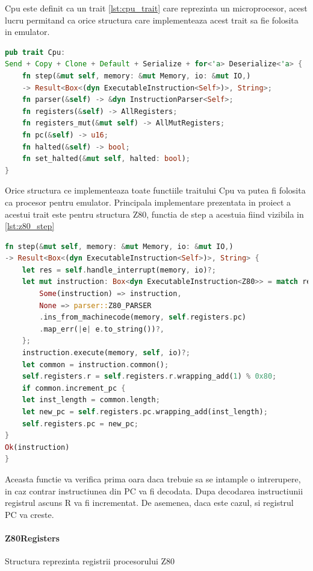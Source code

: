 \documentclass[titlepage,12pt]{article}
\DeclareRobustCommand{\code}[1]{{\ttfamily\small #1}}
\begin{document}
\code{Cpu} este definit ca un trait \cref{lst:cpu_trait} care reprezinta un microprocesor, acest lucru permitand ca orice structura care implementeaza acest trait sa fie folosita in emulator.
\begin{lstlisting}[language=Rust,caption={Trait CPU},label={lst:cpu_trait}]
pub trait Cpu:
Send + Copy + Clone + Default + Serialize + for<'a> Deserialize<'a> {
    fn step(&mut self, memory: &mut Memory, io: &mut IO,)
    -> Result<Box<(dyn ExecutableInstruction<Self>)>, String>;
    fn parser(&self) -> &dyn InstructionParser<Self>;
    fn registers(&self) -> AllRegisters;
    fn registers_mut(&mut self) -> AllMutRegisters;
    fn pc(&self) -> u16;
    fn halted(&self) -> bool;
    fn set_halted(&mut self, halted: bool);
}
\end{lstlisting}
Orice structura ce implementeaza toate functiile traitului \code{Cpu} va putea fi folosita ca procesor pentru emulator. Principala implementare prezentata in proiect a acestui trait este pentru structura \code{Z80}, functia de step a acestuia fiind vizibila in \cref{lst:z80_step}
\begin{lstlisting}[language=Rust,caption={Functia step Z80},label={lst:z80_step}]
fn step(&mut self, memory: &mut Memory, io: &mut IO,)
-> Result<Box<(dyn ExecutableInstruction<Self>)>, String> {
    let res = self.handle_interrupt(memory, io)?;
    let mut instruction: Box<dyn ExecutableInstruction<Z80>> = match res {
        Some(instruction) => instruction,
        None => parser::Z80_PARSER
        .ins_from_machinecode(memory, self.registers.pc)
        .map_err(|e| e.to_string())?,
    };
    instruction.execute(memory, self, io)?;
    let common = instruction.common();
    self.registers.r = self.registers.r.wrapping_add(1) % 0x80;
    if common.increment_pc {
    let inst_length = common.length;
    let new_pc = self.registers.pc.wrapping_add(inst_length);
    self.registers.pc = new_pc;
}
Ok(instruction)
}
\end{lstlisting}

Aceasta functie va verifica prima oara daca trebuie sa se intample o intrerupere, in caz contrar instructiunea din PC va fi decodata. Dupa decodarea instructiunii registrul ascuns R va fi incrementat. De asemenea, daca este cazul, si registrul PC va creste.

\paragraph{\code{Z80Registers}} Structura reprezinta registrii procesorului Z80
\end{document}
